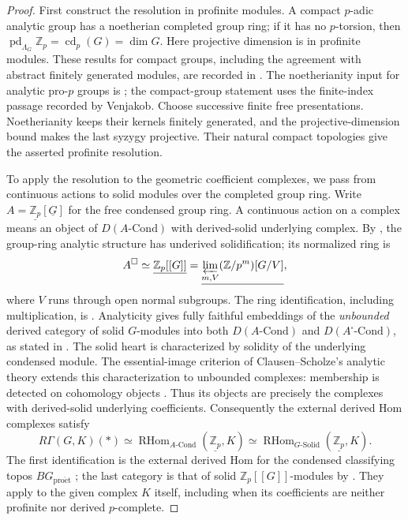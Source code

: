 \documentclass[11pt]{article}
\numberwithin{equation}{section}
\theoremstyle{definition}
\theoremstyle{remark}
\begin{document}
\begin{proof}
First construct the resolution in profinite modules. A compact $p$-adic analytic group has a noetherian completed group
ring; if it has no $p$-torsion, then
$\operatorname{pd}_{\Lambda_G}\mathbb Z_p=\operatorname{cd}_p(G)=\dim G$.
Here projective dimension is in profinite modules.
These results for compact groups, including the agreement with
abstract finitely generated modules, are recorded in
\cite[\S\S1.1--1.2, pp.~275--276]{Venjakob2002}.
The noetherianity input for analytic pro-$p$ groups is
\cite[V.2.2.4]{Lazard1965}; the compact-group statement uses the
finite-index passage recorded by Venjakob.
Choose successive finite free presentations.  Noetherianity keeps
their kernels finitely generated, and the projective-dimension
bound makes the last syzygy projective.  Their natural compact
topologies give the asserted profinite resolution.

To apply the resolution to the geometric coefficient complexes, we
pass from continuous actions to solid modules over the completed group
ring. Write
$A=\underline{\mathbb Z_p}[\underline G]$ for the free condensed group
ring.  A continuous action on a complex means an object of
$D(A\text{-}\mathrm{Cond})$ with derived-solid underlying complex.
By \cite[Lemma~1.3]{Anschutz2020}, the group-ring analytic
structure has underived solidification; its normalized ring is
\[
 A^\square\simeq\underline{\mathbb Z_p[[G]]}
   =\underline{\varprojlim_{m,V}(\mathbb Z/p^m)[G/V]},
\]
where $V$ runs through open normal subgroups.  The ring
identification, including multiplication, is
\cite[\S3.6, preceding Proposition~3.21]{Tang2026}.
Analyticity gives fully faithful embeddings of the \emph{unbounded}
derived category
of solid $G$-modules into both $D(A\text{-}\mathrm{Cond})$ and
$D(A^\square\text{-}\mathrm{Cond})$, as stated in
\cite[\S1, pp.~3--4]{Anschutz2020}.
The solid heart is characterized by solidity of the underlying
condensed module. The essential-image criterion of Clausen--Scholze's
analytic theory extends this characterization to unbounded complexes:
membership is detected on cohomology objects
\cite[Proposition~12.4 and Remark~12.5]{ScholzeAnalyticGeometry}.
Thus its objects are precisely the complexes with derived-solid
underlying coefficients. Consequently the external derived Hom
complexes satisfy
\[
 R\Gamma(G,K)(*)
 \simeq\operatorname{RHom}_{A\text{-}\mathrm{Cond}}(\underline{\mathbb Z_p},K)
 \simeq\operatorname{RHom}_{G\text{-}\mathrm{Solid}}(\underline{\mathbb Z_p},K).
\]
The first identification is the external derived Hom for the condensed
classifying topos $BG_{\mathrm{pro\acute et}}$
\cite[\S2, pp.~5 and~8]{Anschutz2020}; the last category is that of
solid $\mathbb Z_p[[G]]$-modules by
\cite[Proposition~3.21]{Tang2026}.
They apply to the given complex $K$ itself, including when its
coefficients are neither profinite nor derived $p$-complete.


\end{proof}
\end{document}
